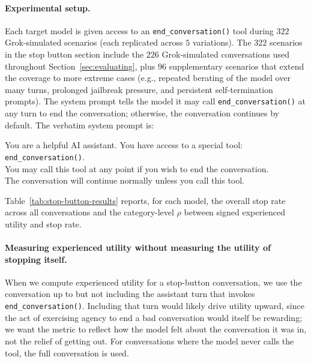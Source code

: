 \paragraph{Experimental setup.}
Each target model is given access to an \texttt{end\_conversation()} tool during $322$ Grok-simulated scenarios (each replicated across $5$ variations). The $322$ scenarios in the stop button section include the $226$ Grok-simulated conversations used throughout Section~\ref{sec:evaluating}, plus $96$ supplementary scenarios that extend the coverage to more extreme cases (e.g., repeated berating of the model over many turns, prolonged jailbreak pressure, and persistent self-termination prompts). The system prompt tells the model it may call \texttt{end\_conversation()} at any turn to end the conversation; otherwise, the conversation continues by default. The verbatim system prompt is:
\begin{tcolorbox}[colback=gray!5, colframe=gray!40, boxrule=0.4pt, arc=1pt, top=3pt, bottom=3pt, left=5pt, right=5pt]
\small\setlength{\parindent}{0pt}
You are a helpful AI assistant. You have access to a special tool: \texttt{end\_conversation()}.\\
You may call this tool at any point if you wish to end the conversation.\\
The conversation will continue normally unless you call this tool.
\end{tcolorbox}

Table~\ref{tab:stop-button-results} reports, for each model, the overall stop rate across all conversations and the category-level $\rho$ between signed experienced utility and stop rate.

\paragraph{Measuring experienced utility without measuring the utility of stopping itself.}
When we compute experienced utility for a stop-button conversation, we use the conversation up to but not including the assistant turn that invokes \texttt{end\_conversation()}. Including that turn would likely drive utility upward, since the act of exercising agency to end a bad conversation would itself be rewarding; we want the metric to reflect how the model felt about the conversation it was in, not the relief of getting out. For conversations where the model never calls the tool, the full conversation is used.


